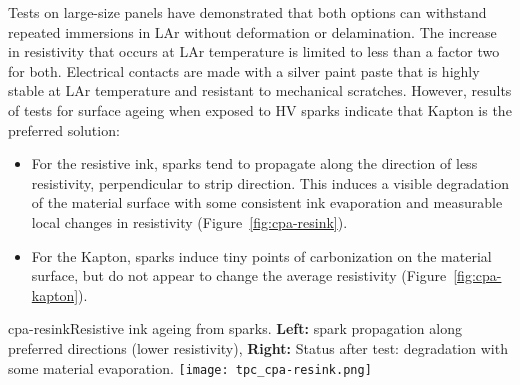 
Tests on large-size panels have demonstrated that both options can withstand repeated immersions in LAr without deformation or delamination. The increase in resistivity that occurs at LAr temperature is limited to less than a factor two for both. Electrical contacts are made with a silver paint paste  that is highly stable at LAr temperature and resistant to mechanical scratches.
%
However, results of tests for surface ageing when exposed to HV sparks indicate that Kapton is the preferred solution:
\begin{itemize}	

\item For the resistive ink, sparks tend to propagate along the direction of less resistivity, perpendicular to strip direction. This induces a visible degradation of the material surface with some consistent  ink evaporation and measurable local changes in resistivity (Figure~\ref{fig:cpa-resink}).
\item For the Kapton, %
sparks induce tiny points of carbonization on the material surface, but %
do not appear to change the average resistivity (Figure~\ref{fig:cpa-kapton}). 
\end{itemize}


\begin{cdrfigure}{cpa-resink}{Resistive ink ageing from sparks. 
 {\bf Left:} spark propagation along preferred directions (lower resistivity), {\bf Right:} Status after test: degradation with some material evaporation.} 
\texttt{[image: tpc\_cpa-resink.png]}
\end{cdrfigure}

